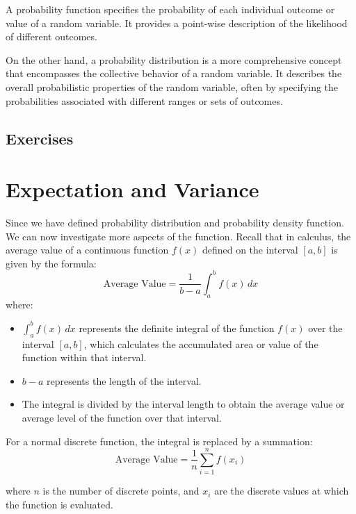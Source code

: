 A probability function specifies the probability of each individual outcome or value of a random variable. It provides a point-wise description of the likelihood of different outcomes.

On the other hand, a probability distribution is a more comprehensive concept that encompasses the collective behavior of a random variable. It describes the overall probabilistic properties of the random variable, often by specifying the probabilities associated with different ranges or sets of outcomes.
\subsection{Exercises}

\section{Expectation and Variance}
Since we have defined probability distribution and probability density function. We can now investigate more aspects of the function. Recall that in calculus, the average value of a continuous function $f(x)$ defined on the interval $[a, b]$ is given by the formula:
\begin{equation}
\text{Average Value} = \frac{1}{b - a} \int_{a}^{b} f(x) \, dx
\end{equation}
where:
\begin{itemize}
    \item $\int_{a}^{b} f(x) \, dx$ represents the definite integral of the function $f(x)$ over the interval $[a, b]$, which calculates the accumulated area or value of the function within that interval.
    \item $b - a$ represents the length of the interval.
    \item The integral is divided by the interval length to obtain the average value or average level of the function over that interval.
\end{itemize}
For a normal discrete function, the integral is replaced by a summation:
\begin{equation}\label{dissum}
\text{Average Value} = \frac{1}{n} \sum_{i=1}^{n} f(x_i)
\end{equation}

where $n$ is the number of discrete points, and $x_i$ are the discrete values at which the function is evaluated.

